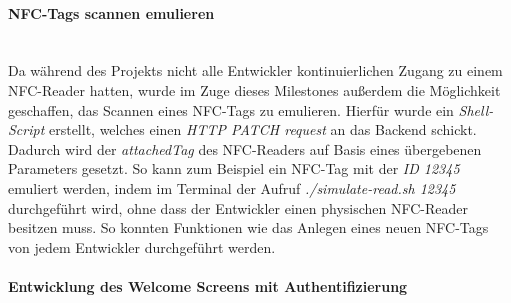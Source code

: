 \documentclass[10pt, a4paper]{article}
\begin{document}
\begin{onehalfspace}
\paragraph*{NFC-Tags scannen emulieren} $~$ \\
Da während des Projekts nicht alle Entwickler kontinuierlichen Zugang zu einem NFC-Reader hatten, wurde im Zuge dieses Milestones außerdem die Möglichkeit
geschaffen, das Scannen eines NFC-Tags zu emulieren. Hierfür wurde ein \textit{Shell-Script} erstellt, welches einen \textit{HTTP PATCH request} an
das Backend schickt. Dadurch wird der \textit{attachedTag} des NFC-Readers auf Basis eines übergebenen Parameters gesetzt. So kann zum Beispiel ein NFC-Tag mit
der \textit{ID 12345} emuliert werden, indem im Terminal der Aufruf \textit{./simulate-read.sh 12345} durchgeführt wird, ohne dass der Entwickler einen physischen NFC-Reader besitzen muss. So konnten Funktionen wie das Anlegen eines neuen NFC-Tags von jedem Entwickler durchgeführt werden.

\paragraph*{Entwicklung des Welcome Screens mit Authentifizierung} $~$ \\


\end{onehalfspace}
\end{document}
